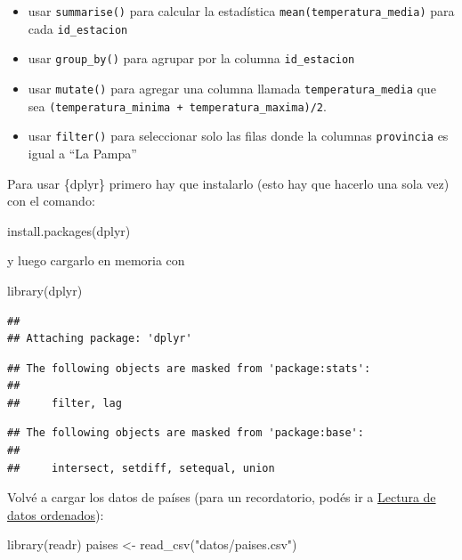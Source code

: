 \documentclass[
  openany]{book}
\newenvironment{Shaded}{\begin{snugshade}}{\end{snugshade}}
\newcommand{\FunctionTok}[1]{\textcolor[rgb]{0.00,0.00,0.00}{#1}}
\newcommand{\NormalTok}[1]{#1}
\newcommand{\OtherTok}[1]{\textcolor[rgb]{0.56,0.35,0.01}{#1}}
\newcommand{\StringTok}[1]{\textcolor[rgb]{0.31,0.60,0.02}{#1}}
\providecommand{\tightlist}{%
  \setlength{\itemsep}{0pt}\setlength{\parskip}{0pt}}
\begin{document}
\begin{itemize}
\tightlist
\item
  usar \texttt{summarise()} para calcular la estadística \texttt{mean(temperatura\_media)} para cada \texttt{id\_estacion}
\item
  usar \texttt{group\_by()} para agrupar por la columna \texttt{id\_estacion}
\item
  usar \texttt{mutate()} para agregar una columna llamada \texttt{temperatura\_media} que sea \texttt{(temperatura\_minima\ +\ temperatura\_maxima)/2}.
\item
  usar \texttt{filter()} para seleccionar solo las filas donde la columnas \texttt{provincia} es igual a ``La Pampa''
\end{itemize}

Para usar \{dplyr\} primero hay que instalarlo (esto hay que hacerlo una sola vez) con el comando:

\begin{Shaded}
\begin{Highlighting}[]
\FunctionTok{install.packages}\NormalTok{(}\StringTok{\textquotesingle{}dplyr\textquotesingle{}}\NormalTok{)}
\end{Highlighting}
\end{Shaded}

y luego cargarlo en memoria con

\begin{Shaded}
\begin{Highlighting}[]
\FunctionTok{library}\NormalTok{(dplyr)}
\end{Highlighting}
\end{Shaded}

\begin{verbatim}
## 
## Attaching package: 'dplyr'
\end{verbatim}

\begin{verbatim}
## The following objects are masked from 'package:stats':
## 
##     filter, lag
\end{verbatim}

\begin{verbatim}
## The following objects are masked from 'package:base':
## 
##     intersect, setdiff, setequal, union
\end{verbatim}

Volvé a cargar los datos de países (para un recordatorio, podés ir a \href{04-lectura-datos.html}{Lectura de datos ordenados}):

\begin{Shaded}
\begin{Highlighting}[]
\FunctionTok{library}\NormalTok{(readr)}
\NormalTok{paises }\OtherTok{\textless{}{-}} \FunctionTok{read\_csv}\NormalTok{(}\StringTok{"datos/paises.csv"}\NormalTok{)}
\end{Highlighting}
\end{Shaded}
\end{document}
